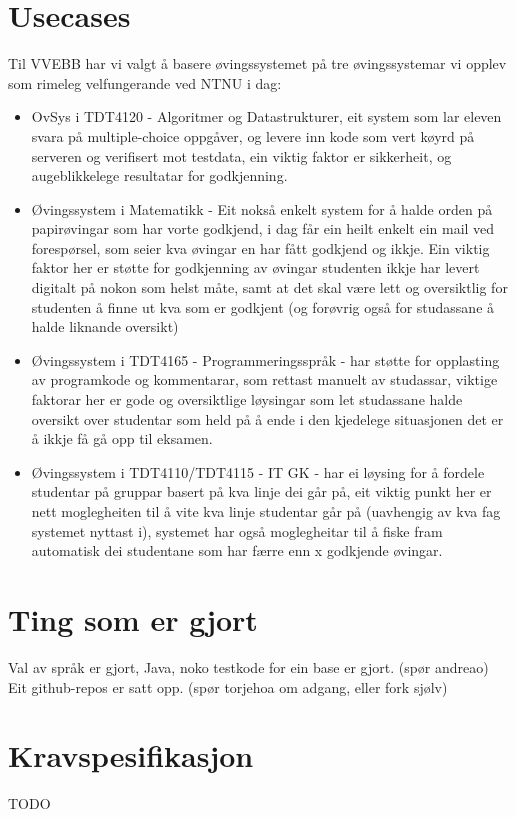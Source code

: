 \documentclass[12pt]{article}
\begin{document}
  \section{Usecases}
  Til VVEBB har vi valgt å basere øvingssystemet på tre øvingssystemar vi opplev som rimeleg velfungerande
  ved NTNU i dag:
  \begin{itemize}
  \item OvSys i TDT4120 - Algoritmer og Datastrukturer, eit system som lar eleven svara på multiple-choice oppgåver,
  og levere inn kode som vert køyrd på serveren og verifisert mot testdata, ein viktig faktor er sikkerheit, og augeblikkelege resultatar for godkjenning.
  \item Øvingssystem i Matematikk - Eit nokså enkelt system for å halde orden på papirøvingar som har vorte godkjend, i dag får ein heilt enkelt ein mail ved forespørsel, som seier kva øvingar en har fått godkjend og ikkje. Ein viktig faktor her er støtte for godkjenning av øvingar studenten ikkje har levert digitalt på nokon som helst måte, samt at det skal være lett og oversiktlig for studenten å finne ut kva som er godkjent (og forøvrig også for studassane å halde liknande oversikt)
  \item Øvingssystem i TDT4165 - Programmeringsspråk - har støtte for opplasting av programkode og kommentarar, som rettast manuelt av studassar, viktige faktorar her er gode og oversiktlige løysingar som let studassane halde oversikt over studentar som held på å ende i den kjedelege situasjonen det er å ikkje få gå opp til eksamen.
  \item Øvingssystem i TDT4110/TDT4115 - IT GK - har ei løysing for å fordele studentar på gruppar basert på kva linje dei går på, eit viktig punkt her er nett moglegheiten til å vite kva linje studentar går på (uavhengig av kva fag systemet nyttast i), systemet har også moglegheitar til å fiske fram automatisk dei studentane som har færre enn x godkjende øvingar.
  \end{itemize}
  
  \section{Ting som er gjort}
  Val av språk er gjort, Java, noko testkode for ein base er gjort. (spør andreao)
  Eit github-repos er satt opp. (spør torjehoa om adgang, eller fork sjølv)
  
  \section{Kravspesifikasjon}
  TODO
  
\end{document}
